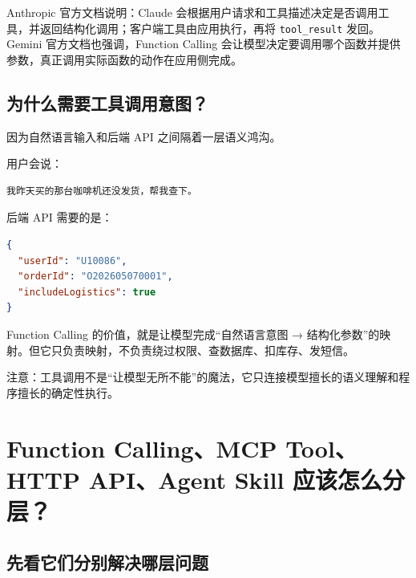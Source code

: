 \documentclass[9pt,a4paper,twocolumn]{ctexart}
\begin{document}
Anthropic 官方文档说明：Claude 会根据用户请求和工具描述决定是否调用工具，并返回结构化调用；客户端工具由应用执行，再将 \texttt{tool\_result} 发回。Gemini 官方文档也强调，Function Calling 会让模型决定要调用哪个函数并提供参数，真正调用实际函数的动作在应用侧完成。



\subsection*{为什么需要工具调用意图？}


因为自然语言输入和后端 API 之间隔着一层语义鸿沟。



用户会说：



\begin{lstlisting}
我昨天买的那台咖啡机还没发货，帮我查下。
\end{lstlisting}



后端 API 需要的是：



\begin{lstlisting}[language=json]
{
  "userId": "U10086",
  "orderId": "O202605070001",
  "includeLogistics": true
}
\end{lstlisting}



Function Calling 的价值，就是让模型完成“自然语言意图 → 结构化参数”的映射。但它只负责映射，不负责绕过权限、查数据库、扣库存、发短信。



注意：工具调用不是“让模型无所不能”的魔法，它只连接模型擅长的语义理解和程序擅长的确定性执行。



\section*{Function Calling、MCP Tool、HTTP API、Agent Skill 应该怎么分层？}




\subsection*{先看它们分别解决哪层问题}
\end{document}
